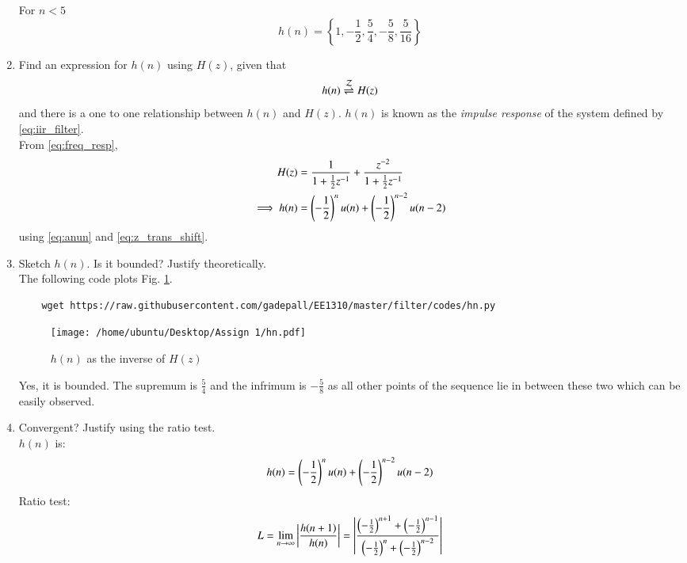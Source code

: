 \documentclass[journal,12pt,twocolumn]{IEEEtran}
\renewcommand\thesection{\arabic{section}}
\begin{document}
\begin{enumerate}[label=\thesection.\arabic*]
For $n < 5$
\begin{equation}
	h(n) = \left\{1, -\frac{1}{2}, \frac{5}{4}, -\frac{5}{8}, \frac{5}{16}\right\}
\end{equation}
\item \label{prob:impulse_resp}
Find an expression for $h(n)$ using $H(z)$, given that 
\begin{equation}
	\label{eq:impulse_resp}
	h(n) \overset{\mathcal{Z}}{ \rightleftharpoons} H(z)
\end{equation}
and there is a one to one relationship between $h(n)$ and $H(z)$. $h(n)$ is known as the {\em impulse response} of the
system defined by \eqref{eq:iir_filter}.
\\
\solution From \eqref{eq:freq_resp},
\begin{align}
	H(z) &= \frac{1}{1 + \frac{1}{2}z^{-1}} + \frac{ z^{-2}}{1 + \frac{1}{2}z^{-1}}
	\\
	\implies h(n) &= \left(-\frac{1}{2}\right)^{n}u(n) + \left(-\frac{1}{2}\right)^{n-2}u(n-2)
\end{align}
using \eqref{eq:anun} and \eqref{eq:z_trans_shift}.
\item Sketch $h(n)$. Is it bounded? Justify theoretically.
\\
\solution The following code plots Fig. \ref{fig:hn}.
\begin{lstlisting}
	wget https://raw.githubusercontent.com/gadepall/EE1310/master/filter/codes/hn.py
\end{lstlisting}
\begin{figure}[!ht]
	\centering
	\texttt{[image: /home/ubuntu/Desktop/Assign 1/hn.pdf]}
	\caption{$h(n)$ as the inverse of $H(z)$}
	\label{fig:hn}
\end{figure}
Yes, it is bounded. The supremum is $\frac{5}{4}$ and the infrimum is $-\frac{5}{8}$ as all other points of the sequence lie in between these two which can be easily observed. \\
\item Convergent? Justify using the ratio test. \\
\solution 
$h(n)$ is:
\begin{equation}
	h(n) = \left(-\frac{1}{2}\right)^{n}u(n) + \left(-\frac{1}{2}\right)^{n-2}u(n-2)
\end{equation}
Ratio test:
\begin{equation}
	L = \lim_{n \to \infty}\abs{\frac{h(n+1)}{h(n)}} = \abs{\frac{\brak{-\frac{1}{2}}^{n+1} + \brak{-\frac{1}{2}}^{n-1}}{\brak{-\frac{1}{2}}^{n} + \brak{-\frac{1}{2}}^{n-2}}}

\end{equation}
\end{enumerate}
\end{document}
